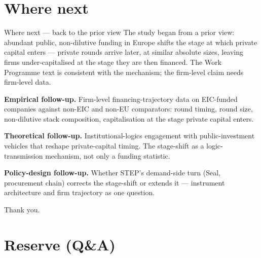 \documentclass[aspectratio=169,hyperref={pdfpagelabels=false}]{beamer}
\begin{document}
\section{Where next}

\begin{frame}{Where next --- back to the prior view}
    The study began from a prior view: abundant public, non-dilutive funding in Europe shifts the stage at which private capital enters --- private rounds arrive later, at similar absolute sizes, leaving firms under-capitalised at the stage they are then financed. The Work Programme text is consistent with the mechanism; the firm-level claim needs firm-level data.

    \vspace{3mm}
    \textbf{Empirical follow-up.} Firm-level financing-trajectory data on EIC-funded companies against non-EIC and non-EU comparators: round timing, round size, non-dilutive stack composition, capitalisation at the stage private capital enters.

    \vspace{2mm}
    \textbf{Theoretical follow-up.} Institutional-logics engagement with public-investment vehicles that reshape private-capital timing. The stage-shift as a logic-transmission mechanism, not only a funding statistic.

    \vspace{2mm}
    \textbf{Policy-design follow-up.} Whether STEP's demand-side turn (Seal, procurement chain) corrects the stage-shift or extends it --- instrument architecture and firm trajectory as one question.

    \vspace{3mm}
    \centering \footnotesize Thank you.
\end{frame}

\appendix
\section{Reserve (Q\&A)}
\end{document}
